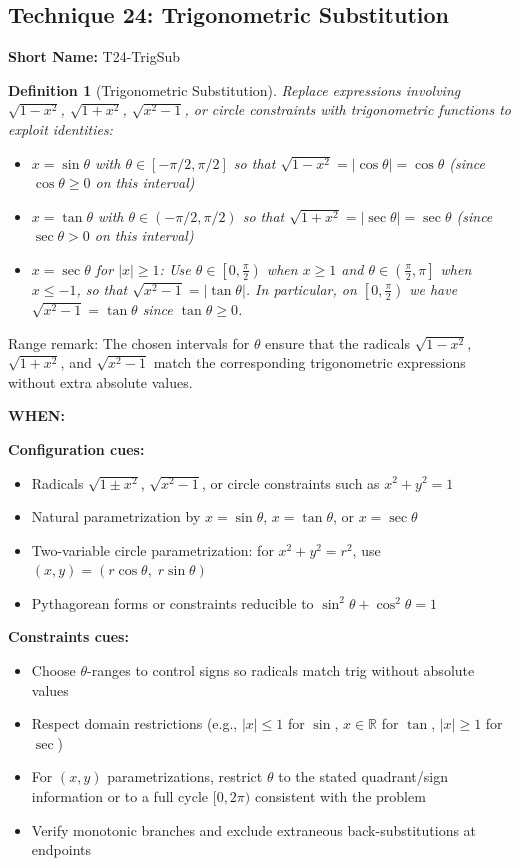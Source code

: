 \documentclass[12pt]{article}
\newtheorem{definition}{Definition}[section]
\begin{document}
\subsection{Technique 24: Trigonometric Substitution}
\textbf{Short Name:} T24-TrigSub

\begin{definition}[Trigonometric Substitution]
Replace expressions involving \\
$\sqrt{1 - x^2}$, $\sqrt{1 + x^2}$, $\sqrt{x^2 - 1}$, or circle constraints with trigonometric functions to exploit identities:
\begin{itemize}
    \item $x = \sin\theta$ with $\theta \in [-\pi/2, \pi/2]$ so that $\sqrt{1 - x^2} = |\cos\theta| = \cos\theta$ (since $\cos\theta \geq 0$ on this interval)
    \item $x = \tan\theta$ with $\theta \in (-\pi/2, \pi/2)$ so that $\sqrt{1 + x^2} = |\sec\theta| = \sec\theta$ (since $\sec\theta > 0$ on this interval)
    \item $x = \sec\theta$ for $|x| \geq 1$: Use $\theta \in \left[0, \tfrac{\pi}{2}\right)$ when $x \ge 1$ and $\theta \in \left(\tfrac{\pi}{2}, \pi\right]$ when $x \le -1$, so that $\sqrt{x^2 - 1} = |\tan\theta|$. In particular, on $\left[0, \tfrac{\pi}{2}\right)$ we have $\sqrt{x^2 - 1} = \tan\theta$ since $\tan\theta \geq 0$.
\end{itemize}
\end{definition}

Range remark: The chosen intervals for $\theta$ ensure that the radicals $\sqrt{1-x^2}$, $\sqrt{1+x^2}$, and $\sqrt{x^2-1}$ match the corresponding trigonometric expressions without extra absolute values.

\textbf{WHEN:}

\textbf{Configuration cues:}
\begin{itemize}
    \item Radicals $\sqrt{1\pm x^2}$, $\sqrt{x^2-1}$, or circle constraints such as $x^2+y^2=1$
    \item Natural parametrization by $x=\sin\theta$, $x=\tan\theta$, or $x=\sec\theta$
    \item Two-variable circle parametrization: for $x^2+y^2=r^2$, use $(x,y)=(r\cos\theta,\; r\sin\theta)$
    \item Pythagorean forms or constraints reducible to $\sin^2\theta+\cos^2\theta=1$
\end{itemize}

\textbf{Constraints cues:}
\begin{itemize}
    \item Choose $\theta$-ranges to control signs so radicals match trig without absolute values
    \item Respect domain restrictions (e.g., $|x|\le 1$ for $\sin$, $x\in\mathbb{R}$ for $\tan$, $|x|\ge 1$ for $\sec$)
    \item For $(x,y)$ parametrizations, restrict $\theta$ to the stated quadrant/sign information or to a full cycle $[0,2\pi)$ consistent with the problem
    \item Verify monotonic branches and exclude extraneous back-substitutions at endpoints
\end{itemize}
\end{document}
